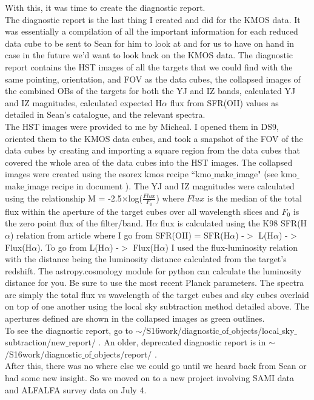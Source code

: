 \documentclass[10pt,letterpaper]{article}
\begin{document}
With this, it was time to create the diagnostic report.\\

The diagnostic report is the last thing I created and did for the KMOS data. It was essentially a compilation of all the important information for each reduced data cube to be sent to Sean for him to look at and for us to have on hand in case in the future we'd want to look back on the KMOS data. The diagnostic report contains the HST images of all the targets that we could find with the same pointing, orientation, and FOV as the data cubes, the collapsed images of the combined OBs of the targets for both the YJ and IZ bands, calculated YJ and IZ magnitudes, calculated expected H$\alpha$ flux from SFR(OII) values as detailed in Sean's catalogue, and the relevant spectra.\\

The HST images were provided to me by Micheal. I opened them in DS9, oriented them to the KMOS data cubes, and took a snapshot of the FOV of the data cubes by creating and importing a square region from the data cubes that covered the whole area of the data cubes into the HST images. The collapsed images were created using the esorex kmos recipe ``kmo$\_$make$\_$image" (see kmo$\_$make$\_$image recipe in document \cite{KMOS pipeline manual}). The YJ and IZ magnitudes were calculated using the relationship M = -2.5$\times$log($\frac{Flux}{F_0}$) where $Flux$ is the median of the total flux within the aperture of the target cubes over all wavelength slices and $F_0$ is the zero point flux of the filter/band. H$\alpha$ flux is calculated using the K98 SFR(H$\alpha$) relation from article \cite{K98} where I go from SFR(OII) = SFR(H$\alpha$) -$>$ L(H$\alpha$) -$>$ Flux(H$\alpha$). To go from L(H$\alpha$) -$>$ Flux(H$\alpha$) I used the flux-luminosity relation with the distance being the luminosity distance calculated from the target's redshift. The astropy.cosmology module for python can calculate the luminosity distance for you. Be sure to use the most recent Planck parameters. The spectra are simply the total flux vs wavelength of the target cubes and sky cubes overlaid on top of one another using the local sky subtraction method detailed above. The apertures defined are shown in the collapsed images as green outlines.\\

To see the diagnostic report, go to $\sim$/S16work/diagnostic$\_$of$\_$objects/local$\_$sky$\_$subtraction/new$\_$report/ . An older, deprecated diagnostic report is in $\sim$/S16work/diagnostic$\_$of$\_$objects/report/ .\\

After this, there was no where else we could go until we heard back from Sean or had some new insight. So we moved on to a new project involving SAMI data and ALFALFA survey data on July 4.
\end{document}
